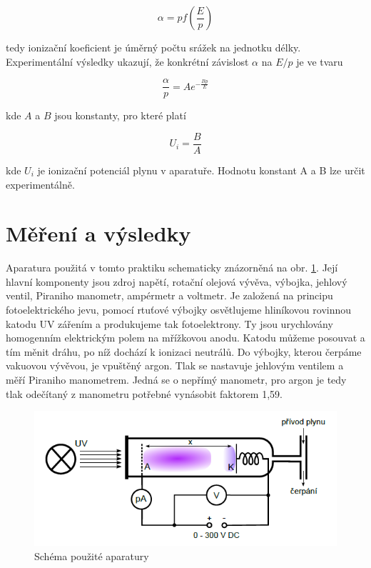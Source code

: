 \documentclass[a4paper,12pt]{article}
\begin{document}
\begin{equation}
	\alpha = p f \left( \frac {E}{p} \right) 
	\label{4}
\end{equation}

tedy ionizační koeficient je úměrný počtu srážek na jednotku délky. Experimentální výsledky ukazují, že konkrétní závislost $\alpha$ na $E/p$ je ve tvaru

\begin{equation}
	\frac{\alpha}{p} = A e^{-\frac{Bp}{E}} 
	\label{5}
\end{equation}

kde $A$ a $B$ jsou konstanty, pro které platí

\begin{equation}
	U_i = \frac{B}{A}
	\label{6}
\end{equation}

kde $U_i$ je ionizační potenciál plynu v aparatuře. Hodnotu konstant A a B lze určit experimentálně.

\section{Měření a výsledky}

Aparatura použitá v tomto praktiku schematicky znázorněná na obr. \ref{aparatura}. Její hlavní komponenty jsou zdroj napětí, rotační olejová vývěva, výbojka, jehlový ventil, Piraniho manometr, ampérmetr a voltmetr. Je založená na principu fotoelektrického jevu, pomocí rtuťové výbojky osvětlujeme hliníkovou rovinnou katodu UV zářením a produkujeme tak fotoelektrony. Ty jsou urychlovány homogenním elektrickým polem na mřížkovou anodu. Katodu můžeme posouvat a tím měnit dráhu, po níž dochází k ionizaci neutrálů. Do výbojky, kterou čerpáme vakuovou vývěvou, je vpuštěný argon. Tlak se nastavuje jehlovým ventilem a měří Piraniho manometrem. Jedná se o nepřímý manometr, pro argon je tedy tlak odečítaný z manometru potřebné vynásobit faktorem 1,59.

\begin{figure}[h]
	\centering
	\includegraphics[width=130mm]{aparatura.png}
	\caption{Schéma použité aparatury}
	\label{aparatura}
\end{figure}
\end{document}
